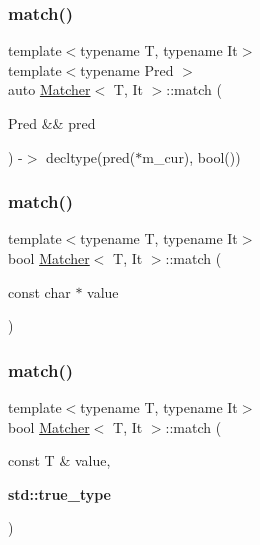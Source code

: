 \mbox{\label{class_matcher_aae9b912f87795d05054746619e237b2d}} 
\subsubsection{\texorpdfstring{match()}{match()}\hspace{0.1cm}{\footnotesize\ttfamily [3/6]}}
{\footnotesize\ttfamily template$<$typename T, typename It$>$ \\
template$<$typename Pred $>$ \\
auto \hyperlink{class_matcher}{Matcher}$<$ T, It $>$\+::match (\begin{DoxyParamCaption}\item[{Pred \&\&}]{pred }\end{DoxyParamCaption}) -\/$>$ decltype(pred($\ast$m\+\_\+cur), bool())
  \hspace{0.3cm}{\ttfamily [inline]}}

\mbox{\label{class_matcher_adeb27a509701a96d922d98ade0080bcd}} 
\subsubsection{\texorpdfstring{match()}{match()}\hspace{0.1cm}{\footnotesize\ttfamily [4/6]}}
{\footnotesize\ttfamily template$<$typename T, typename It$>$ \\
bool \hyperlink{class_matcher}{Matcher}$<$ T, It $>$\+::match (\begin{DoxyParamCaption}\item[{const char $\ast$}]{value }\end{DoxyParamCaption})\hspace{0.3cm}{\ttfamily [inline]}}

\mbox{\label{class_matcher_acf713afbc98dd0b324ed04f52ccad568}} 
\subsubsection{\texorpdfstring{match()}{match()}\hspace{0.1cm}{\footnotesize\ttfamily [5/6]}}
{\footnotesize\ttfamily template$<$typename T, typename It$>$ \\
bool \hyperlink{class_matcher}{Matcher}$<$ T, It $>$\+::match (\begin{DoxyParamCaption}\item[{const T \&}]{value,  }\item[{\textbf{ std\+::true\+\_\+type}}]{ }\end{DoxyParamCaption})\hspace{0.3cm}{\ttfamily [inline]}}

